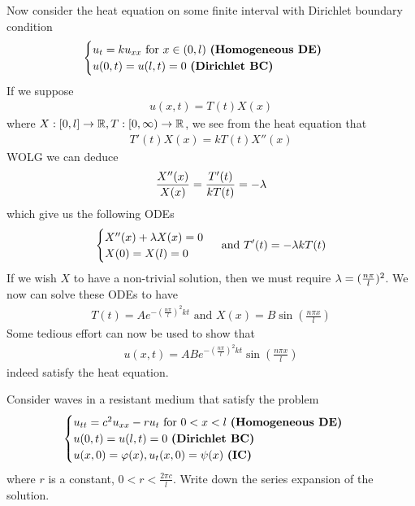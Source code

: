 \documentclass{report}
\begin{document}
\begin{mdframed}
Now consider the heat equation on some finite interval with Dirichlet boundary condition 
\begin{align*}
\begin{cases}
  u_{t}=ku_{xx}\text{ for }x\in (0,l)\text{ \textbf{(Homogeneous DE)} } \\
  u(0,t)=u(l,t)=0\text{ \textbf{(Dirichlet BC)} }
\end{cases}
\end{align*}
If we suppose 
\begin{align*}
u(x,t)=T(t)X(x)
\end{align*}
where $X:[0,l]\rightarrow \R,T:[0,\infty)\rightarrow \R$, we see from the heat equation that 
\begin{align*}
T'(t)X(x)=k T(t)X''(x)
\end{align*}
WOLG we can deduce 
\begin{align*}
\frac{X''(x)}{X(x)}= \frac{T'(t)}{kT(t)}=-\ld 
\end{align*}
which give us the following ODEs 
\begin{align*}
\begin{cases}
  X''(x)+\ld  X(x)=0 \\
  X(0)=X(l)=0
\end{cases}\text{ and }T'(t)=-\ld  kT(t)
\end{align*}
If we wish $X$ to have a non-trivial solution, then we must require  $\ld = (\frac{n \pi}{l})^2$. We now can solve these ODEs to have 
\begin{align*}
T(t)=Ae^{ -(\frac{n \pi}{l})^2  kt}\text{ and }X(x)= B\sin ( \frac{n \pi x}{l})
\end{align*}
Some tedious effort can now be used to show that 
\begin{align*}
u(x,t)=AB e^{ -(\frac{n \pi}{l})^2kt}\sin (\frac{n \pi x}{l})
\end{align*}
indeed satisfy the heat equation. 
\end{mdframed}
\begin{question}{}{}
Consider waves in a resistant medium that satisfy the problem 
\begin{align*}
\begin{cases}
  u_{tt}=c^2u_{xx}-ru_t\text{ for }0<x<l\text{ \textbf{(Homogeneous DE)} }\\
  u(0,t)=u(l,t)=0\text{ \textbf{(Dirichlet BC)} }\\
  u(x,0)=\phi (x),u_t(x,0)=\psi (x)\text{ \textbf{(IC)} }
\end{cases}
\end{align*}
where $r$ is a constant, $0<r<\frac{2\pi c}{l}$. Write down the series expansion of the solution.
\end{question}
\end{document}
